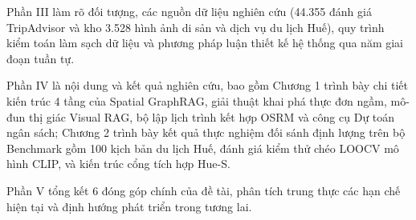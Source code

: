 Phần III làm rõ đối tượng, các nguồn dữ liệu nghiên cứu (44.355 đánh giá TripAdvisor và kho 3.528 hình ảnh di sản và dịch vụ du lịch Huế), quy trình kiểm toán làm sạch dữ liệu và phương pháp luận thiết kế hệ thống qua năm giai đoạn tuần tự.

Phần IV là nội dung và kết quả nghiên cứu, bao gồm Chương 1 trình bày chi tiết kiến trúc 4 tầng của Spatial GraphRAG, giải thuật khai phá thực đơn ngầm, mô-đun thị giác Visual RAG, bộ lập lịch trình kết hợp OSRM và công cụ Dự toán ngân sách; Chương 2 trình bày kết quả thực nghiệm đối sánh định lượng trên bộ Benchmark gồm 100 kịch bản du lịch Huế, đánh giá kiểm thử chéo LOOCV mô hình CLIP, và kiến trúc cổng tích hợp Hue-S.

Phần V tổng kết 6 đóng góp chính của đề tài, phân tích trung thực các hạn chế hiện tại và định hướng phát triển trong tương lai.
